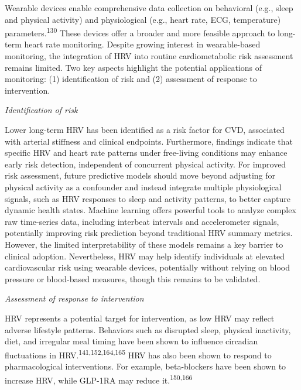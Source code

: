 \documentclass[
  letterpaper,
  headsepline=true,
  open=any]{scrbook}
\begin{document}
Wearable devices enable comprehensive data collection on behavioral
(e.g., sleep and physical activity) and physiological (e.g., heart rate,
ECG, temperature) parameters.\textsuperscript{130} These devices offer a
broader and more feasible approach to long-term heart rate monitoring.
Despite growing interest in wearable-based monitoring, the integration
of HRV into routine cardiometabolic risk assessment remains limited. Two
key aspects highlight the potential applications of monitoring: (1)
identification of risk and (2) assessment of response to intervention.

\emph{Identification of risk}

Lower long-term HRV has been identified as a risk factor for CVD,
associated with arterial stiffness and clinical endpoints. Furthermore,
findings indicate that specific HRV and heart rate patterns under
free-living conditions may enhance early risk detection, independent of
concurrent physical activity. For improved risk assessment, future
predictive models should move beyond adjusting for physical activity as
a confounder and instead integrate multiple physiological signals, such
as HRV responses to sleep and activity patterns, to better capture
dynamic health states. Machine learning offers powerful tools to analyze
complex raw time-series data, including interbeat intervals and
accelerometer signals, potentially improving risk prediction beyond
traditional HRV summary metrics. However, the limited interpretability
of these models remains a key barrier to clinical adoption.
Nevertheless, HRV may help identify individuals at elevated
cardiovascular risk using wearable devices, potentially without relying
on blood pressure or blood-based measures, though this remains to be
validated.

\emph{Assessment of response to intervention}

HRV represents a potential target for intervention, as low HRV may
reflect adverse lifestyle patterns. Behaviors such as disrupted sleep,
physical inactivity, diet, and irregular meal timing have been shown to
influence circadian fluctuations in
HRV.\textsuperscript{141,152,164,165} HRV has also been shown to respond
to pharmacological interventions. For example, beta-blockers have been
shown to increase HRV, while GLP-1RA may reduce
it.\textsuperscript{150,166}
\end{document}
